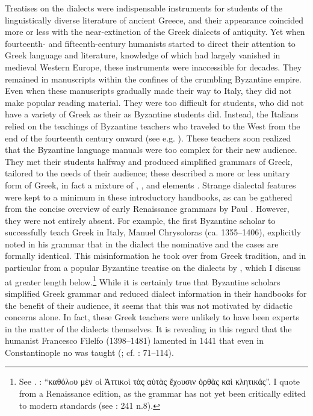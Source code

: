 Treatises on the dialects were indispensable instruments for students of the linguistically diverse literature of ancient Greece, and their appearance coincided more or less with the near-extinction of the Greek dialects of antiquity. Yet when fourteenth- and fifteenth-century  humanists started to direct their attention to Greek language and literature, knowledge of which had largely vanished in medieval Western Europe, these instruments were inaccessible for decades. They remained in manuscripts within the confines of the crumbling Byzantine empire. Even when these manuscripts gradually made their way to Italy, they did not make popular reading material. They were too difficult for  students, who did not have a variety of Greek as their  as Byzantine students did. Instead, the Italians relied on the teachings of Byzantine teachers who traveled to the West from the end of the fourteenth century onward (see e.g. \citealt{Harris1995,Botley2010,Wilson2016}). These teachers soon realized that the Byzantine language manuals were too complex for their new audience. They met their students halfway and produced simplified grammars of Greek, tailored to the needs of their  audience; these described a more or less unitary form of Greek, in fact a mixture of , , and  elements \citep[123]{Ciccolella2008}. Strange dialectal features were kept to a minimum in these introductory handbooks, as can be gathered from the concise overview of early Renaissance grammars by Paul \citet{Botley2010}. However, they were not entirely absent. For example, the first Byzantine scholar to successfully teach Greek in Italy, Manuel Chrysoloras (ca. 1355–1406), explicitly noted in his grammar that in the  dialect the nominative and the  cases are formally identical. This misinformation he took over from Greek tradition, and in particular from a popular Byzantine treatise on the dialects by , which I discuss at greater length below.\footnote{See \textcite[166 n.70]{Botley2010}. \citet[20]{Chrysoloras1512}: “καθόλoυ μὲν oἱ Ἀττικoὶ τὰς αὐτὰς ἔχoυσιν ὀρθὰς καὶ κλητικάς”. I quote from a Renaissance edition, as the grammar has not yet been critically edited to modern standards (see \citealt{Nuti2013}: 241 n.8).} While it is certainly true that Byzantine scholars simplified Greek grammar and reduced dialect information in their handbooks for the benefit of their  audience, it seems that this was not motivated by didactic concerns alone. In fact, these Greek teachers were unlikely to have been experts in the matter of the dialects themselves. It is revealing in this regard that the  humanist Francesco Filelfo (1398–1481) lamented in 1441 that even in Constantinople no  was taught (\citealt[88 n.4]{Rotolo1973}; cf. \citealt{Botley2010}: 71–114).

